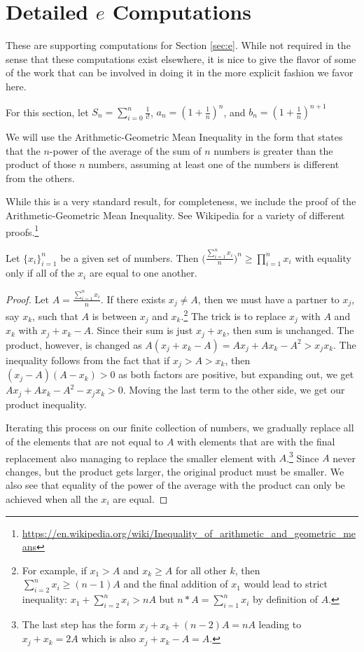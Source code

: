 \documentclass[12pt]{article}
\begin{document}
\section{Detailed \texorpdfstring{$e$}{e} Computations}\label{app:e}

These are supporting computations for Section \ref{sec:e}. While not required in the sense that these computations exist elsewhere, it is nice to give the flavor of some of the work that can be involved in doing it in the more explicit fashion we favor here. 

For this section, let $S_n = \sum_{i=0}^n \frac{1}{i!}$, $a_n = (1+\frac{1}{n})^{n}  $, and $b_n = (1+\frac{1}{n})^{n+1}$

We will use the Arithmetic-Geometric Mean Inequality in the form that states that the $n$-power of the average of the sum of $n$ numbers is greater than the product of those $n$ numbers, assuming at least one of the numbers is different from the others. 

While this is a very standard result, for completeness, we include the proof of the Arithmetic-Geometric Mean Inequality. See Wikipedia for a variety of different proofs.\footnote{\url{https://en.wikipedia.org/wiki/Inequality_of_arithmetic_and_geometric_means}}

\begin{proposition}
    Let $\{x_i\}_{i=1}^n$ be a given set of numbers. Then $\big(\frac{\sum_{i=1}^n x_i}{n}\big)^n \geq  \prod_{i=1}^n x_i$ with equality only if all of the $x_i$ are equal to one another. 
\end{proposition}

\begin{proof}
    Let $A = \frac{\sum_{i=1}^n x_i}{n}$. If there exists $x_j \neq A$, then we must have a partner to $x_j$, say $x_k$, such that $A$ is between $x_j$ and $x_k$.\footnote{For example, if $x_1 > A$ and $x_k \geq A$ for all other $k$, then $\sum_{i=2}^n x_i \geq (n-1) A$ and the final addition of $x_1$ would lead to strict inequality: $x_1 + \sum_{i=2}^n x_i > n A$ but $n*A = \sum_{i=1}^n x_i$ by definition of $A$.} The trick is to replace $x_j$ with $A$ and $x_k$ with $x_j + x_k - A$. Since their sum is just $x_j + x_k$, then sum is unchanged. The product, however, is changed as $A(x_j + x_k - A) = Ax_j + A x_k - A^2 > x_j x_k$. The inequality follows from the fact that if $x_j > A > x_k$, then $(x_j - A)(A-x_k) > 0$ as both factors are positive, but expanding out, we get $A x_j + Ax_k - A^2 - x_j x_k > 0$. Moving the last term to the other side, we get our product inequality. 

    Iterating this process on our finite collection of numbers, we gradually replace all of the elements that are not equal to $A$ with elements that are with the final replacement also managing to replace the smaller element with $A$.\footnote{The last step has the form $x_j + x_k + (n-2)A = n A$ leading to $x_j +x_k = 2A$ which is also $x_j + x_k - A = A$.} Since $A$ never changes, but the product gets larger, the original product must be smaller. We also see that equality of the power of the average with the product can only be achieved when all the $x_i$ are equal.  
\end{proof}
\end{document}
